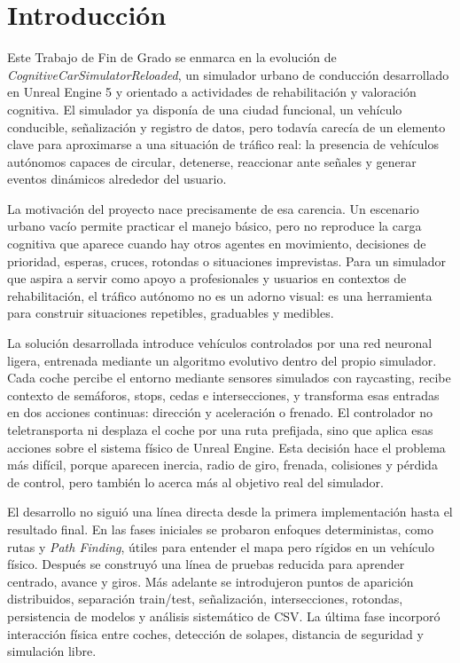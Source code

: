\chapter{Introducción}

Este Trabajo de Fin de Grado se enmarca en la evolución de \textit{CognitiveCarSimulatorReloaded}, un simulador urbano de conducción desarrollado en Unreal Engine 5 y orientado a actividades de rehabilitación y valoración cognitiva. El simulador ya disponía de una ciudad funcional, un vehículo conducible, señalización y registro de datos, pero todavía carecía de un elemento clave para aproximarse a una situación de tráfico real: la presencia de vehículos autónomos capaces de circular, detenerse, reaccionar ante señales y generar eventos dinámicos alrededor del usuario.

La motivación del proyecto nace precisamente de esa carencia. Un escenario urbano vacío permite practicar el manejo básico, pero no reproduce la carga cognitiva que aparece cuando hay otros agentes en movimiento, decisiones de prioridad, esperas, cruces, rotondas o situaciones imprevistas. Para un simulador que aspira a servir como apoyo a profesionales y usuarios en contextos de rehabilitación, el tráfico autónomo no es un adorno visual: es una herramienta para construir situaciones repetibles, graduables y medibles.

La solución desarrollada introduce vehículos controlados por una red neuronal ligera, entrenada mediante un algoritmo evolutivo dentro del propio simulador. Cada coche percibe el entorno mediante sensores simulados con raycasting, recibe contexto de semáforos, stops, cedas e intersecciones, y transforma esas entradas en dos acciones continuas: dirección y aceleración o frenado. El controlador no teletransporta ni desplaza el coche por una ruta prefijada, sino que aplica esas acciones sobre el sistema físico de Unreal Engine. Esta decisión hace el problema más difícil, porque aparecen inercia, radio de giro, frenada, colisiones y pérdida de control, pero también lo acerca más al objetivo real del simulador.

\enlargethispage{\baselineskip}
{
El desarrollo no siguió una línea directa desde la primera implementación hasta el resultado final. En las fases iniciales se probaron enfoques deterministas, como rutas y \textit{Path Finding}, útiles para entender el mapa pero rígidos en un vehículo físico. Después se construyó una línea de pruebas reducida para aprender centrado, avance y giros. Más adelante se introdujeron puntos de aparición distribuidos, separación train/test, señalización, intersecciones, rotondas, persistencia de modelos y análisis sistemático de CSV\@. La última fase incorporó interacción física entre coches, detección de solapes, distancia de seguridad y simulación libre.
\par}


